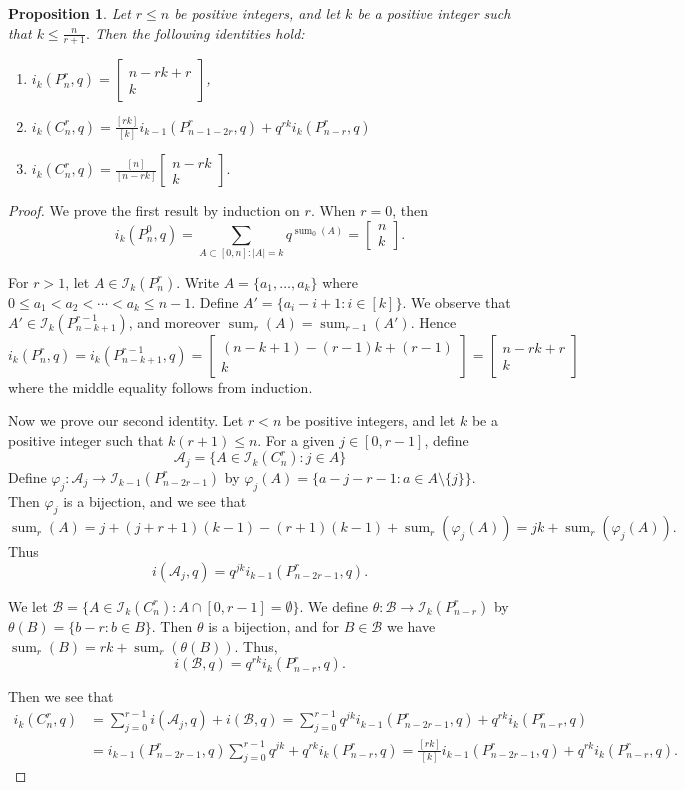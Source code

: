 \documentclass[12pt]{article}
\newtheorem{proposition}[theorem]{Proposition}
\theoremstyle{definition}
\newcommand{\gau}[2]{\left[ \begin{array}{c} #1 \\ #2 \end{array} \right]}
\DeclareMathOperator{\ssum}{sum}
\begin{document}
\begin{proposition}
Let $r \leq n$ be positive integers, and let $k$ be a positive integer such that $k \leq \frac{n}{r+1}.$
Then the following identities hold:
\begin{enumerate}
\item $i_k(P^r_n,q) = \gau{n-rk+r}{k}$,
\item $i_k(C_n^r, q) = \frac{[rk]}{[k]}i_{k-1}(P_{n-1-2r}^r,q)+q^{rk}i_k(P^r_{n-r},q)$ 
\item $i_k(C_n^r,q) = \frac{[n]}{[n-rk]}\gau{n-rk}{k}.$
\label{prop:closed}
\end{enumerate}
\end{proposition}
\begin{proof}
 We prove the first result by induction on $r$. 
 When $r=0$, then \[i_k(P_n^0,q) = \sum_{A \subset [0,n]: |A| = k} q^{\ssum_0(A)} = \gau{n}{k}. \]

For $r > 1$, let $A \in \mathcal{I}_k(P^r_n).$ Write $A = \{a_1, \ldots, a_k\}$ where $0 \leq a_1 < a_2 < \cdots < a_k \leq n-1.$ 
Define $A' = \{a_i - i+1: i \in [k] \}$. We observe that $A' \in \mathcal{I}_{k}(P_{n-k+1}^{r-1})$, and moreover $\ssum_r(A) = \ssum_{r-1}(A').$ Hence \[i_k(P_n^r,q) = i_k(P_{n-k+1}^{r-1},q) = \gau{(n-k+1)-(r-1)k+(r-1)}{k} = \gau{n-rk+r}{k}\] 
where the middle equality follows from induction. 

Now we prove our second identity.
Let $r < n$ be positive integers, and let $k$ be a positive integer such that $k(r+1) \leq n$. 
For a given $j \in [0,r-1]$, define
\[\mathcal{A}_j = \{A \in \mathcal{I}_k(C_n^r): j \in A \} \]
Define $\varphi_j: \mathcal{A}_j \to \mathcal{I}_{k-1}(P_{n-2r-1}^r)$ by $\varphi_j(A) = \{a - j-r-1: a \in A \setminus \{j\} \}$. Then $\varphi_j$ is a bijection, and we see that 
\[\ssum_r(A) = j+(j+r+1)(k-1) - (r+1)(k-1) + \ssum_r(\varphi_j(A)) = jk + \ssum_r(\varphi_j(A)).\] 
Thus \[i(\mathcal{A}_j,q) = q^{jk} i_{k-1}(P_{n-2r-1}^r,q) .\]

We let $\mathcal{B} = \{A \in \mathcal{I}_k(C_n^r): A \cap [0,r-1] = \emptyset \}$. We define $\theta:\mathcal{B} \to \mathcal{I}_k(P_{n-r}^r)$ by 
$\theta(B) = \{b - r: b \in B \}$. Then $\theta$ is a bijection, and for $B \in \mathcal{B}$ we have $\ssum_r(B) = rk + \ssum_r(\theta(B))$.
Thus, \[i(\mathcal{B},q) = q^{rk} i_k(P_{n-r}^r,q) .\]

Then we see that 
\begin{align*} i_k(C_n^r,q)  & =  \sum_{j=0}^{r-1} i(\mathcal{A}_j,q)  +  i(\mathcal{B},q) 
 =  \sum_{j=0}^{r-1} q^{jk} i_{k-1}(P_{n-2r-1}^r,q)  +  q^{rk}i_k(P_{n-r}^r,q) \\ 
 & =  i_{k-1}(P_{n-2r-1}^r,q)\sum_{j=0}^{r-1} q^{jk}  +  q^{rk}i_k(P_{n-r}^r,q)  
 =  \frac{[rk]}{[k]} i_{k-1}(P_{n-2r-1}^r,q)  +  q^{rk}i_k(P_{n-r}^r,q). \end{align*}


\end{proof}
\end{document}
